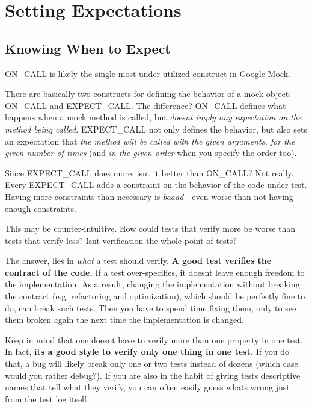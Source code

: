 \section*{Setting Expectations}

\subsection*{Knowing When to Expect}

{\ttfamily O\+N\+\_\+\+C\+A\+LL} is likely the single most under-\/utilized construct in Google \mbox{\hyperlink{classMock}{Mock}}.

There are basically two constructs for defining the behavior of a mock object\+: {\ttfamily O\+N\+\_\+\+C\+A\+LL} and {\ttfamily E\+X\+P\+E\+C\+T\+\_\+\+C\+A\+LL}. The difference? {\ttfamily O\+N\+\_\+\+C\+A\+LL} defines what happens when a mock method is called, but {\itshape doesn\textquotesingle{}t imply any expectation on the method being called.} {\ttfamily E\+X\+P\+E\+C\+T\+\_\+\+C\+A\+LL} not only defines the behavior, but also sets an expectation that {\itshape the method will be called with the given arguments, for the given number of times} (and {\itshape in the given order} when you specify the order too).

Since {\ttfamily E\+X\+P\+E\+C\+T\+\_\+\+C\+A\+LL} does more, isn\textquotesingle{}t it better than {\ttfamily O\+N\+\_\+\+C\+A\+LL}? Not really. Every {\ttfamily E\+X\+P\+E\+C\+T\+\_\+\+C\+A\+LL} adds a constraint on the behavior of the code under test. Having more constraints than necessary is {\itshape baaad} -\/ even worse than not having enough constraints.

This may be counter-\/intuitive. How could tests that verify more be worse than tests that verify less? Isn\textquotesingle{}t verification the whole point of tests?

The answer, lies in {\itshape what} a test should verify. {\bfseries{A good test verifies the contract of the code.}} If a test over-\/specifies, it doesn\textquotesingle{}t leave enough freedom to the implementation. As a result, changing the implementation without breaking the contract (e.\+g. refactoring and optimization), which should be perfectly fine to do, can break such tests. Then you have to spend time fixing them, only to see them broken again the next time the implementation is changed.

Keep in mind that one doesn\textquotesingle{}t have to verify more than one property in one test. In fact, {\bfseries{it\textquotesingle{}s a good style to verify only one thing in one test.}} If you do that, a bug will likely break only one or two tests instead of dozens (which case would you rather debug?). If you are also in the habit of giving tests descriptive names that tell what they verify, you can often easily guess what\textquotesingle{}s wrong just from the test log itself.

